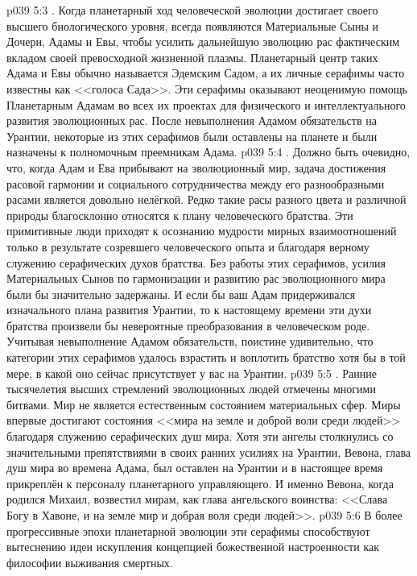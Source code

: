 \vs p039 5:3 . Когда планетарный ход человеческой эволюции достигает своего высшего биологического уровня, всегда появляются Материальные Сыны и Дочери, Адамы и Евы, чтобы усилить дальнейшую эволюцию рас фактическим вкладом своей превосходной жизненной плазмы. Планетарный центр таких Адама и Евы обычно называется Эдемским Садом, а их личные серафимы часто известны как <<голоса Сада>>. Эти серафимы оказывают неоценимую помощь Планетарным Адамам во всех их проектах для физического и интеллектуального развития эволюционных рас. После невыполнения Адамом обязательств на Урантии, некоторые из этих серафимов были оставлены на планете и были назначены к полномочным преемникам Адама.
\vs p039 5:4 . Должно быть очевидно, что, когда Адам и Ева прибывают на эволюционный мир, задача достижения расовой гармонии и социального сотрудничества между его разнообразными расами является довольно нелёгкой. Редко такие расы разного цвета и различной природы благосклонно относятся к плану человеческого братства. Эти примитивные люди приходят к осознанию мудрости мирных взаимоотношений только в результате созревшего человеческого опыта и благодаря верному служению серафических духов братства. Без работы этих серафимов, усилия Материальных Сынов по гармонизации и развитию рас эволюционного мира были бы значительно задержаны. И если бы ваш Адам придерживался изначального плана развития Урантии, то к настоящему времени эти духи братства произвели бы невероятные преобразования в человеческом роде. Учитывая невыполнение Адамом обязательств, поистине удивительно, что категории этих серафимов удалось взрастить и воплотить братство хотя бы в той мере, в какой оно сейчас присутствует у вас на Урантии.
\vs p039 5:5 . Ранние тысячелетия высших стремлений эволюционных людей отмечены многими битвами. Мир не является естественным состоянием материальных сфер. Миры впервые достигают состояния <<мира на земле и доброй воли среди людей>> благодаря служению серафических душ мира. Хотя эти ангелы столкнулись со значительными препятствиями в своих ранних усилиях на Урантии, Вевона, глава душ мира во времена Адама, был оставлен на Урантии и в настоящее время прикреплён к персоналу планетарного управляющего. И именно Вевона, когда родился Михаил, возвестил мирам, как глава ангельского воинства: <<Слава Богу в Хавоне, и на земле мир и добрая воля среди людей>>.
\vs p039 5:6 В более прогрессивные эпохи планетарной эволюции эти серафимы способствуют вытеснению идеи искупления концепцией божественной настроенности как философии выживания смертных.

